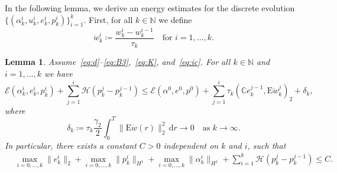 \documentclass[reqno]{amsart}
\newtheorem{lemma}[corollary]{Lemma}
\theoremstyle{definition}
\numberwithin{equation}{section}
\def\de {\mathrm{d}}
\def\N {\mathbb N}
\def\C {\mathbb C}
\def\EE {\mathrm{E}}
\begin{document}
In the following lemma, we  derive an energy estimates for the discrete evolution $\{(\alpha_k^i,u_k^i,e_k^i,p_k^i)\}_{i=1}^k$. First, for all $k\in\N$ we define
\begin{equation*}
\dot w_k^i\coloneqq \frac{w_k^i-w_k^{i-1}}{\tau_k}\quad\text{for $i=1,\dots,k$}.
\end{equation*}

\begin{lemma}\label{lem:glslkey}
Assume~\eqref{eq:d}--\eqref{eq:B3},~\eqref{eq:K}, and~\eqref{eq:ic}. For all $k\in \N$ and $i=1,\dots,k$ we have
\begin{equation}\label{eq:gl_denin}
\mathcal E(\alpha_k^i,e_k^i,p_k^i)+\sum_{j=1}^i\mathcal H(p_k^j-p_k^{j-1})\le \mathcal E(\alpha^0,e^0,p^0)+\sum_{j=1}^i\tau_k(\C e_k^{j-1},\EE \dot w_k^j)_2+\delta_k,
\end{equation}
where
\begin{equation}\label{eq:deltak}
\delta_k\coloneqq \tau_k\frac{\gamma_2}{2}\int_0^T\|\EE \dot w(r)\|_2^2\,\de r\to 0\quad\text{as $k\to\infty$}.
\end{equation}
In particular, there exists a constant $C>0$ independent on $k$ and $i$, such that
\begin{align*}
&\max_{i=0,\dots,k}\|e_k^i\|_2+\max_{i=0,\dots,k}\|p_k^i\|_{H^1}+\max_{i=0,\dots,k}\|\alpha_k^i\|_{H^1}+\sum_{i=1}^k\mathcal H(p_k^j-p_k^{j-1})\le C.
\end{align*}
\end{lemma}
\end{document}
